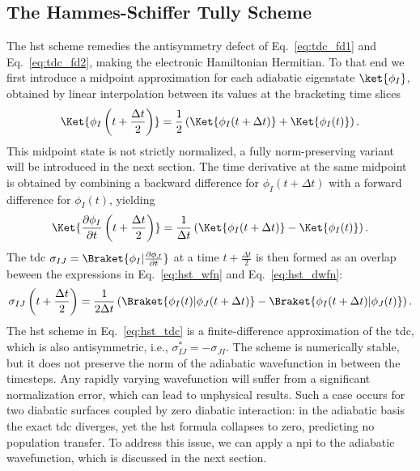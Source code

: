 \subsection{The Hammes-Schiffer Tully Scheme}\label{sec:hammes_schiffer_tully_scheme}
The \acrfull{hst}\supercite{10.1063/1.467455} scheme remedies the antisymmetry defect of Eq.~\eqref{eq:tdc_fd1} and Eq.~\eqref{eq:tdc_fd2}, making the electronic Hamiltonian Hermitian. To that end we first introduce a midpoint approximation for each adiabatic eigenstate $\ket{\phi_I}$, obtained by linear interpolation between its values at the bracketing time slices
\begin{equation}\label{eq:hst_wfn}
\Ket{\phi_I\left(t+\frac{\Delta t}{2}\right)}=\frac{1}{2}\left(\Ket{\phi_I(t+\Delta t)}+\Ket{\phi_I(t)}\right).
\end{equation}
This midpoint state is not strictly normalized, a fully norm-preserving variant will be introduced in the next section. The time derivative at the same midpoint is obtained by combining a backward difference for $\phi_I(t+\Delta t)$ with a forward difference for $\phi_I(t)$, yielding
\begin{equation}\label{eq:hst_dwfn}
\Ket{\frac{\partial \phi_I}{\partial t}\left(t+\frac{\Delta t}{2}\right)}=\frac{1}{\Delta t}\left(\Ket{\phi_I(t+\Delta t)}-\Ket{\phi_I(t)}\right).
\end{equation}
The \acrshort{tdc} $\sigma_{IJ}=\Braket{\phi_I\vert\frac{\partial \phi_J}{\partial t}}$ at a time $t+\frac{\Delta t}{2}$ is then formed as an overlap beween the expressions in Eq.~\eqref{eq:hst_wfn} and Eq.~\eqref{eq:hst_dwfn}:
\begin{equation}\label{eq:hst_tdc}
\sigma_{IJ}\left(t+\frac{\Delta t}{2}\right)=\frac{1}{2\Delta t}\left(\Braket{\phi_I(t)\vert\phi_J(t+\Delta t)}-\Braket{\phi_I(t+\Delta t)\vert\phi_J(t)}\right).
\end{equation}
The \acrshort{hst} scheme in Eq.~\eqref{eq:hst_tdc} is a finite-difference approximation of the \acrshort{tdc}, which is also antisymmetric, i.e., $\sigma_{IJ}^\ast=-\sigma_{JI}$. The scheme is numerically stable, but it does not preserve the norm of the adiabatic wavefunction in between the timesteps. Any rapidly varying wavefunction will suffer from a significant normalization error, which can lead to unphysical results. Such a case occurs for two diabatic surfaces coupled by zero diabatic interaction: in the adiabatic basis the exact \acrshort{tdc} diverges, yet the \acrshort{hst} formula collapses to zero, predicting no population transfer. To address this issue, we can apply a \acrfull{npi} to the adiabatic wavefunction, which is discussed in the next section.

